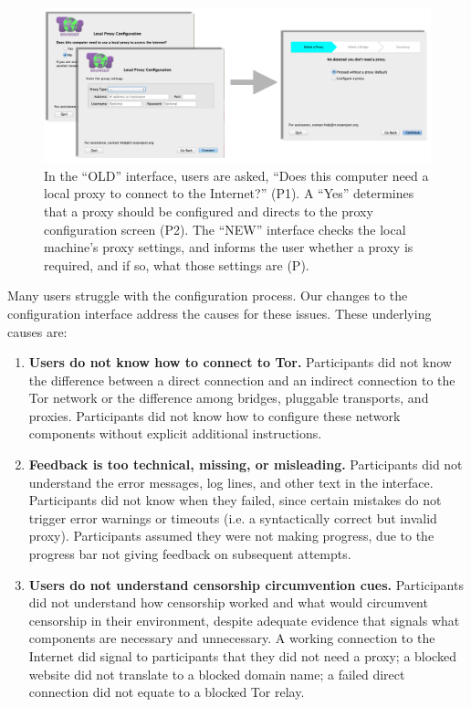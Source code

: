 \documentclass[USenglish,oneside,twocolumn]{article}
\begin{document}
\begin{figure}[t]
	\centering
		\includegraphics[width=.8\textwidth]{proxy-screens.pdf} 
		\caption{In the ``OLD'' interface, users are asked, ``Does this computer need a local proxy to connect
		to the Internet?'' (P1). A ``Yes'' determines that a proxy should be configured and directs to the 
		proxy configuration screen (P2). The ``NEW'' interface checks the local machine's proxy settings,
		and informs the user whether a proxy is required, and if so, what those settings are (P).}
\end{figure}

Many users struggle with the configuration process. Our changes to the configuration interface address the causes for these issues. These underlying causes are:\\

\begin{enumerate}
\item {\bfseries Users do not know how to connect to Tor.} Participants did not know the difference between a direct connection and an indirect connection to the Tor network or the difference among bridges, pluggable transports, and proxies. Participants did not know how to configure these network components without explicit additional instructions. 
\item {\bfseries Feedback is too technical, missing, or misleading.} Participants did not understand the error messages, log lines, and other text in the interface. Participants did not know when they failed, since certain mistakes do not trigger error warnings or timeouts (i.e. a syntactically correct but invalid proxy). Participants assumed they were not making progress, due to the progress bar not giving feedback on subsequent attempts. 
\item {\bfseries Users do not understand censorship circumvention cues.} Participants did not understand how censorship worked and what would circumvent censorship in their environment, despite adequate evidence that signals what components are necessary and unnecessary. A working connection to the Internet did signal to participants that they did not need a proxy; a blocked website did not translate to a blocked domain name; a failed direct connection did not equate to a blocked Tor relay.
 \end{enumerate} 
 
\end{document}
